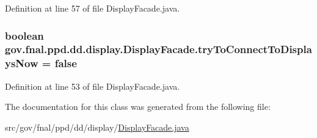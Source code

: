 Definition at line 57 of file Display\-Facade.\-java.

\hypertarget{classgov_1_1fnal_1_1ppd_1_1dd_1_1display_1_1DisplayFacade_a0e46150fb1f40a87bac5060ea85c6dcc}{
\subsubsection[{try\-To\-Connect\-To\-Displays\-Now}]{\setlength{\rightskip}{0pt plus 5cm}boolean gov.\-fnal.\-ppd.\-dd.\-display.\-Display\-Facade.\-try\-To\-Connect\-To\-Displays\-Now = false\hspace{0.3cm}{\ttfamily [static]}}}\label{classgov_1_1fnal_1_1ppd_1_1dd_1_1display_1_1DisplayFacade_a0e46150fb1f40a87bac5060ea85c6dcc}


Definition at line 53 of file Display\-Facade.\-java.



The documentation for this class was generated from the following file\-:\begin{DoxyCompactItemize}
\item 
src/gov/fnal/ppd/dd/display/\hyperlink{DisplayFacade_8java}{Display\-Facade.\-java}\end{DoxyCompactItemize}
